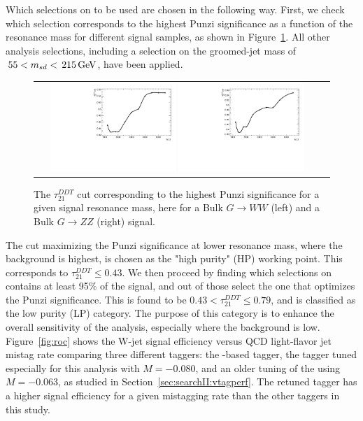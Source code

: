 Which selections on \ddt to be used are chosen in the following way. First, we check which \ddt selection corresponds to the highest Punzi significance as a function of the resonance mass for different signal samples, as shown in Figure~\ref{fig:punzi}. All other analysis selections, including a selection on the groomed-jet mass of $\text{\,55} < m_{sd} < \text{\,215}{\ensuremath{\,\text{Ge\hspace{-.08em}V}}}$, have been applied.
\begin{figure}[h!]
\centering
\begin{tabular}{cc}
\includegraphics[width=0.45\textwidth]{figures/analysis/search3/AN-17-303/vtag/tau21ddt_punzi_BulkGravToZZToZhadZhad.pdf}
\includegraphics[width=0.45\textwidth]{figures/analysis/search3/AN-17-303/vtag/tau21ddt_punzi_BulkGravToWW.pdf}
\end{tabular}
\caption{The $\tau_{21}^{DDT}$ cut corresponding to the highest Punzi significance for a given signal resonance mass, here for a Bulk $G\rightarrow WW$ (left) and a Bulk $G\rightarrow ZZ$ (right) signal.}
\label{fig:punzi}
\end{figure}
The cut maximizing the Punzi significance at lower resonance mass, where the background is highest, is chosen as the "high purity" (HP) working point.
This corresponds to $\tau_{21}^{DDT} \leq 0.43$. We then proceed by finding which selections on \ddt contains at least 95\% of the signal, and out of those select the one that optimizes the Punzi significance. This is found to be $0.43<\tau_{21}^{DDT}\leq0.79$, and is classified as the low purity (LP) category. The purpose of this category is to enhance the overall sensitivity of the analysis, especially where the background is low.
Figure~\ref{fig:roc} shows the W-jet signal efficiency versus QCD light-flavor jet mistag rate comparing three different taggers: the \nsubj-based tagger, the \ddt tagger tuned especially for this analysis with $\ensuremath{M} = -0.080$, and an older tuning of the \ddt using $\ensuremath{M} = -0.063$, as studied in Section~\ref{sec:searchII:vtagperf}. The retuned \ddt tagger has a higher signal efficiency for a given mistagging rate than the other taggers in this study.
